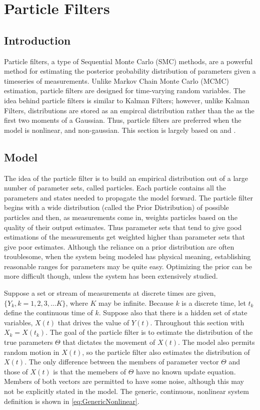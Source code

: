 \chapter{Particle Filters}
\label{sec:Particle Filter}
\section{Introduction}
Particle filters, a type of Sequential Monte Carlo (SMC) methods,
are a powerful method for estimating the posterior probability distribution
 of parameters given a timeseries of measurements. Unlike Markov 
Chain Monte Carlo (MCMC) estimation, particle filters are designed for 
time-varying random variables. The idea behind particle filters is
similar to Kalman Filters; however, unlike Kalman Filters,
distributions are stored as an empircal distribution rather than the
as the first two moments of a Gaussian. Thus, particle filters are 
preferred when the model is nonlinear, and non-gaussian. This section
is largely based on \cite{Arulampalam2002a} and \cite{Thrun2005}.

\section{Model}
\label{sec:Particle Filter Model}
The idea of the particle filter is to build an empirical distribution
out of a large number of parameter sets, called particles. Each
particle contains all the parameters and states needed to propagate
the model forward.  The particle filter begins with a wide distribution 
(called the Prior Distribution)
of possible particles and then, as measurements come in, weights 
particles based on the quality of their output estimates. Thus parameter sets 
that tend to give good estimations of the measurements get weighted higher
than parameter sets that give poor estimates. Although the reliance on
a prior distribution are often troublesome, when the system being modeled
has physical meaning, establishing reasonable ranges for parameters may be 
quite easy. Optimizing the prior can be more difficult though,
unless the system has been extensively studied.

Suppose a set or stream of measurements at discrete times are given, 
$\{Y_k, k = 1, 2, 3, ... K\}$, where $K$ may be infinite. 
Because $k$ is a discrete time, let $t_k$ define the continuous
time of $k$.
Suppose also that there is a hidden set of state variables,
$X(t)$ that drives the value of $Y(t)$. Throughout this section
with $X_k = X(t_k)$. The goal of the particle filter is to estimate the 
distribution of the
true parameters $\Theta$ that dictates the movement of $X(t)$.
The model also permits random motion in $X(t)$, so the 
particle filter also estimates the distribution of $X(t)$.
The only difference between the members of parameter vector
$\Theta$ and those of $X(t)$ is that the memebers of
$\Theta$ have no known update equation. Members of both vectors
are permitted to have some noise, although this
may not be explicitly stated in the model. The generic, continuous, nonlinear
system definition is shown in \autoref{eq:GenericNonlinear}.

